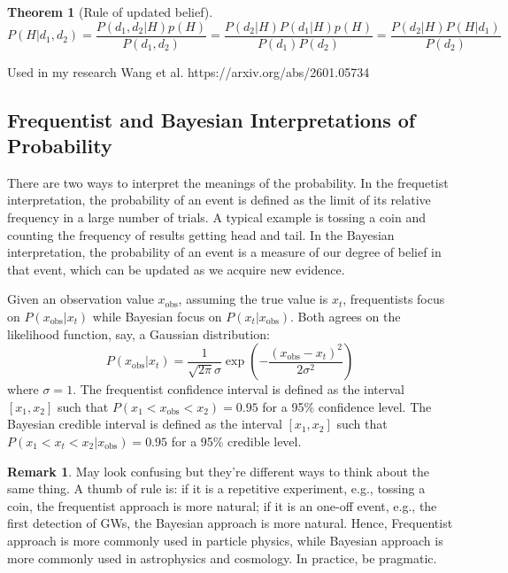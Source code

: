 \documentclass[12pt, a4paper]{article}
\newcounter{lecture}              %
\theoremstyle{plain} %
\newtheorem{theorem}{Theorem}[lecture]      %
\theoremstyle{definition} %
\newtheorem{remark}{Remark}[lecture]
\begin{document}
\begin{theorem}[Rule of updated belief]
    \begin{equation}
 P(H|d_1,d_2) = \frac{P(d_1,d_2|H)p(H)}{P(d_1,d_2)} = \frac{P(d_2|H)P(d_1|H)p(H)}{P(d_1)P(d_2)} = \frac{P(d_2|H)P(H|d_1)}{P(d_2)}       
    \end{equation}
 \end{theorem}
Used in my research Wang et al. https://arxiv.org/abs/2601.05734

\subsection*{Frequentist and Bayesian Interpretations of Probability}
There are two ways to interpret the meanings of the probability. In the frequetist interpretation, the probability of an event is defined as the limit of its relative frequency in a large number of trials. A typical example is tossing a coin and counting the frequency of results getting head and tail. 
In the Bayesian interpretation, the probability of an event is a measure of our degree of belief in that event, which can be updated as we acquire new evidence.

Given an observation value $x_\mathrm{obs}$, assuming the true value is $x_t$, frequentists focus on $P(x_\mathrm{obs}|x_t)$ while Bayesian focus on $P(x_t|x_\mathrm{obs})$. Both agrees on the likelihood function, say, a Gaussian distribution:
\begin{equation}
    P(x_\mathrm{obs}|x_t) = \frac{1}{\sqrt{2\pi}\sigma} \exp\left(-\frac{(x_\mathrm{obs}-x_t)^2}{2\sigma^2}\right)
\end{equation}
where $\sigma=1$.
The frequentist confidence interval is defined as the interval $[x_1, x_2]$ such that $P(x_1 < x_\mathrm{obs} < x_2) = 0.95$ for a 95\% confidence level. The Bayesian credible interval is defined as the interval $[x_1, x_2]$ such that $P(x_1 < x_t < x_2 | x_\mathrm{obs}) = 0.95$ for a 95\% credible level. 

\begin{remark}
    May look confusing but they're different ways to think about the same thing. A thumb of rule is: if it is a repetitive experiment, e.g., tossing a coin, the frequentist approach is more natural; if it is an one-off event, e.g., the first detection of GWs, the Bayesian approach is more natural. Hence, Frequentist approach is more commonly used in particle physics, while Bayesian approach is more commonly used in astrophysics and cosmology. In practice, be pragmatic.
\end{remark}
\end{document}
